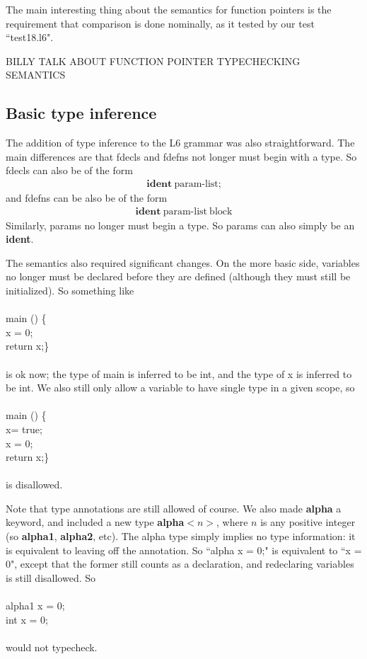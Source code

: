\documentclass{article}
\begin{document}
The main interesting thing about the semantics for function pointers is the requirement that comparison is done nominally, as it tested by our test ``test18.l6".

BILLY TALK ABOUT FUNCTION POINTER TYPECHECKING SEMANTICS

\subsection{Basic type inference}
The addition of type inference to the L6 grammar was also straightforward. The main differences are that fdecls and fdefns not longer must begin with a type. So fdecls can also be of the form
\begin{align*}
\textbf{ident} \ \textrm{param-list};
\end{align*}
and fdefns can be also be of the form
\begin{align*}
\textbf{ident} \ \textrm{param-list} \ \textrm{block}
\end{align*}
Similarly, params no longer must begin a type. So params can also simply be an \textbf{ident}.

The semantics also required significant changes. On the more basic side, variables no longer must be declared before they are defined (although they must still be initialized). So something like\\
\\
main () \{\\
 x = 0;\\
 return x;\}\\
 \\
is ok now; the type of main is inferred to be int, and the type of x is inferred to be int. We also still only allow a variable to have single type in a given scope, so\\
\\
main () \{\\
 x= true;\\
 x = 0;\\
 return x;\}\\
 \\
is disallowed. 

Note that type annotations are still allowed of course. We also made \textbf{alpha} a keyword, and included a new type \textbf{alpha}$<n>$, where $n$ is any positive integer (so \textbf{alpha1}, \textbf{alpha2}, etc). The alpha type simply implies no type information: it is equivalent to leaving off the annotation. So ``alpha x = 0;" is equivalent to ``x = 0", except that the former still counts as a declaration, and redeclaring variables is still disallowed. So\\
\\
alpha1 x = 0;\\
int x = 0;\\
\\
would not typecheck.
\end{document}

